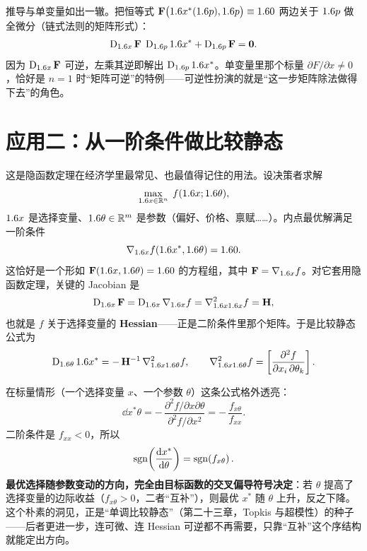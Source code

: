推导与单变量如出一辙。把恒等式 $\mathbf{F}\bigl(1.6 x^*(1.6 p),1.6 p\bigr)\equiv1.6 0$ 两边关于 $1.6 p$ 做全微分（链式法则的矩阵形式）：
\[
    \operatorname{D}_{1.6 x}\mathbf{F}\;\operatorname{D}_{1.6 p}1.6 x^*+\operatorname{D}_{1.6 p}\mathbf{F}=\mathbf{0} .
\]
因为 $\operatorname{D}_{1.6 x}\mathbf{F}$ 可逆，左乘其逆即解出 $\operatorname{D}_{1.6 p}1.6 x^*$。单变量里那个标量 $\partial F/\partial x\neq 0$，恰好是 $n=1$ 时``矩阵可逆''的特例——可逆性扮演的就是``这一步矩阵除法做得下去''的角色。

\section{应用二：从一阶条件做比较静态}
\label{sec:ift-foc}

这是隐函数定理在经济学里最常见、也最值得记住的用法。设决策者求解
\[
    \max_{1.6 x\in\mathbb{R}^{n}}\; f(1.6 x;1.6\theta),
\]
$1.6 x$ 是选择变量、$1.6\theta\in\mathbb{R}^m$ 是参数（偏好、价格、禀赋……）。内点最优解满足一阶条件
\[
    \nabla_{1.6 x} f(1.6 x^*,1.6\theta)=1.6 0 .
\]
这恰好是一个形如 $\mathbf{F}(1.6 x,1.6\theta)=1.6 0$ 的方程组，其中 $\mathbf{F}=\nabla_{1.6 x} f$。对它套用隐函数定理，关键的 Jacobian 是
\[
    \operatorname{D}_{1.6 x}\mathbf{F}=\operatorname{D}_{1.6 x}\nabla_{1.6 x} f=\nabla^2_{1.6 x1.6 x} f=\mathbf{H},
\]
也就是 $f$ 关于选择变量的 \textbf{Hessian}——正是二阶条件里那个矩阵。于是比较静态公式为
\[
    \operatorname{D}_{1.6\theta}1.6 x^*=-\,\mathbf{H}^{-1}\,\nabla^2_{1.6 x1.6\theta} f,
    \qquad
    \nabla^2_{1.6 x1.6\theta} f=\left[\frac{\partial^2 f}{\partial x_i\,\partial \theta_k}\right] .
\]


在标量情形（一个选择变量 $x$、一个参数 $\theta$）这条公式格外透亮：
\[
    \dd{x^*}{\theta}=-\,\frac{\partial^2 f/\partial x\partial\theta}{\partial^2 f/\partial x^2}
    =-\,\frac{f_{x\theta}}{f_{xx}} .
\]
二阶条件是 $f_{xx}<0$，所以
\[
    \operatorname{sgn}\!\left(\frac{\mathop{}\!\mathrm{d} x^*}{\mathop{}\!\mathrm{d} \theta}\right)=\operatorname{sgn}\!\left(f_{x\theta}\right) .
\]
\textbf{最优选择随参数变动的方向，完全由目标函数的交叉偏导符号决定}：若 $\theta$ 提高了选择变量的边际收益（$f_{x\theta}>0$，二者``互补''），则最优 $x^*$ 随 $\theta$ 上升，反之下降。这个朴素的洞见，正是``单调比较静态''（第二十三章，Topkis 与超模性）的种子——后者更进一步，连可微、连 Hessian 可逆都不再需要，只靠``互补''这个序结构就能定出方向。

